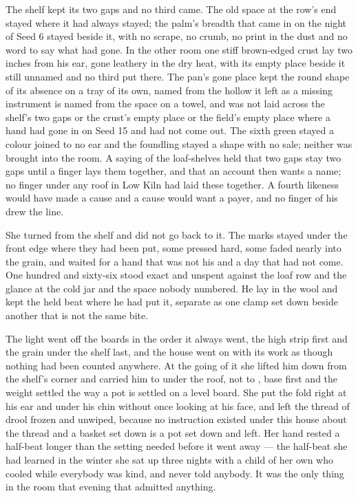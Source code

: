 The shelf kept its two gaps and no third came. The old space at the row's end stayed where it had always stayed; the palm's breadth that came in on the night of Seed 6 stayed beside it, with no scrape, no crumb, no print in the dust and no word to say what had gone. In the other room one stiff brown-edged crust lay two inches from his ear, gone leathery in the dry heat, with its empty place beside it still unnamed and no third put there. The pan's gone place kept the round shape of its absence on a tray of its own, named from the hollow it left as a missing instrument is named from the space on a towel, and was not laid across the shelf's two gaps or the crust's empty place or the field's empty place where a hand had gone in on Seed 15 and had not come out. The sixth green stayed a colour joined to no ear and the foundling stayed a shape with no sale; neither was brought into the room. A saying of the loaf-shelves held that two gaps stay two gaps until a finger lays them together, and that an account then wants a name; no finger under any roof in Low Kiln had laid these together. A fourth likeness would have made a cause and a cause would want a payer, and no finger of his drew the line.

She turned from the shelf and did not go back to it. The marks stayed under the front edge where they had been put, some pressed hard, some faded nearly into the grain, and waited for a hand that was not his and a day that had not come. One hundred and sixty-six stood exact and unspent against the loaf row and the glance at the cold jar and the space nobody numbered. He lay in the wool and kept the held beat where he had put it, separate as one clamp set down beside another that is not the same bite.

\scenebreak

The light went off the boards in the order it always went, the high strip first and the grain under the shelf last, and the house went on with its work as though nothing had been counted anywhere. At the going of it she lifted him down from the shelf's corner and carried him to  under the roof, not to , base first and the weight settled the way a pot is settled on a level board. She put the fold right at his ear and under his chin without once looking at his face, and left the thread of drool frozen and unwiped, because no instruction existed under this house about the thread and a basket set down is a pot set down and left. Her hand rested a half-beat longer than the setting needed before it went away --- the half-beat she had learned in the winter she sat up three nights with a child of her own who cooled while everybody was kind, and never told anybody. It was the only thing in the room that evening that admitted anything.

